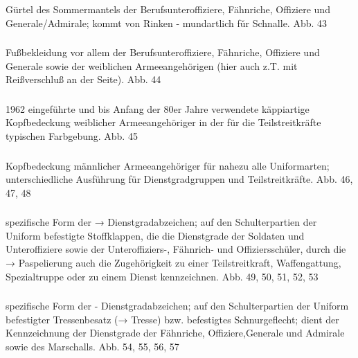 Gürtel des Sommermantels der Berufsunteroffiziere, Fähnriche, Offiziere und Generale/Admirale; kommt von Rinken - mundartlich fǔr Schnalle. Abb. 43

\subsubsection*{}%

Fußbekleidung vor allem der Berufsunteroffiziere, Fähnriche, Offiziere und Generale sowie der weiblichen Armeeangehörigen (hier auch z.T. mit Reißverschluß an der
Seite). Abb. 44

\subsubsection*{}%

1962 eingeführte und bis Anfang der 80er Jahre verwendete käppiartige Kopfbedeckung weiblicher Armeeangehöriger in der für die Teilstreitkräfte typischen Farbgebung. Abb. 45

\subsubsection*{}%

Kopfbedeckung männlicher Armeeangehöriger für nahezu alle Uniformarten; unterschiedliche Ausführung für Dienstgradgruppen und Teilstreitkräfte. Abb. 46, 47, 48

\subsubsection*{}%

spezifische Form der → Dienstgradabzeichen; auf den Schulterpartien der Uniform befestigte Stoffklappen, die die Dienstgrade der Soldaten und Unteroffiziere sowie der Unteroffiziers-, Fähnrich- und Offiziersschüler, durch die → Paspelierung auch die Zugehörigkeit zu einer Teilstreitkraft, Waffengattung, Spezialtruppe oder zu einem Dienst kennzeichnen. Abb. 49, 50, 51, 52, 53

\subsubsection*{}%

spezifische Form der - Dienstgradabzeichen; auf den Schulterpartien der Uniform befestigter Tressenbesatz (→ Tresse) bzw. befestigtes Schnurgeflecht; dient der Kennzeichnung der Dienstgrade der Fähnriche, Offiziere,Generale und Admirale sowie des Marschalls. Abb. 54, 55, 56, 57

